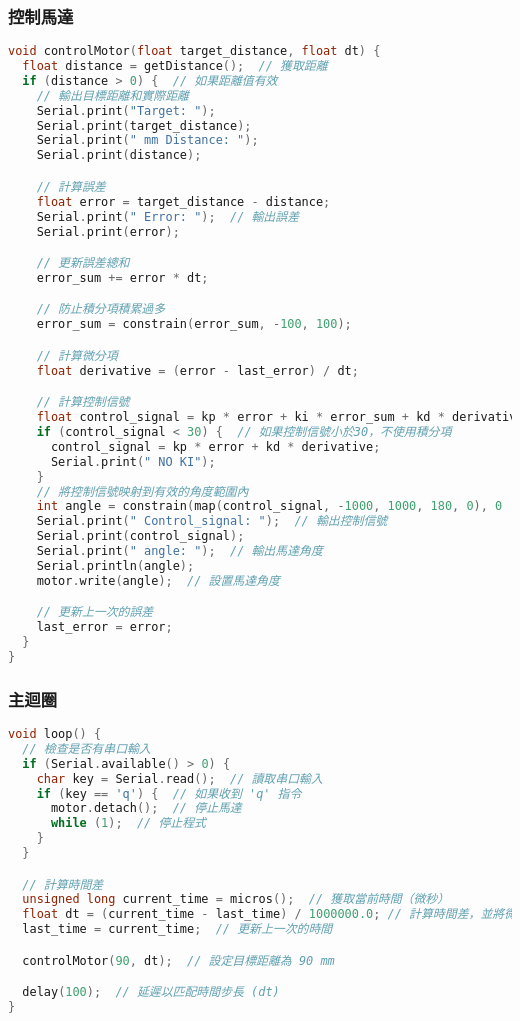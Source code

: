 \subsubsection{控制馬達}
\begin{lstlisting}[language=C]
void controlMotor(float target_distance, float dt) {
  float distance = getDistance();  // 獲取距離
  if (distance > 0) {  // 如果距離值有效
    // 輸出目標距離和實際距離
    Serial.print("Target: ");
    Serial.print(target_distance);
    Serial.print(" mm Distance: ");
    Serial.print(distance);

    // 計算誤差
    float error = target_distance - distance;
    Serial.print(" Error: ");  // 輸出誤差
    Serial.print(error);

    // 更新誤差總和
    error_sum += error * dt;

    // 防止積分項積累過多
    error_sum = constrain(error_sum, -100, 100);

    // 計算微分項
    float derivative = (error - last_error) / dt;

    // 計算控制信號
    float control_signal = kp * error + ki * error_sum + kd * derivative;
    if (control_signal < 30) {  // 如果控制信號小於30，不使用積分項
      control_signal = kp * error + kd * derivative;
      Serial.print(" NO KI");
    }
    // 將控制信號映射到有效的角度範圍內
    int angle = constrain(map(control_signal, -1000, 1000, 180, 0), 0 , 180);
    Serial.print(" Control_signal: ");  // 輸出控制信號
    Serial.print(control_signal);
    Serial.print(" angle: ");  // 輸出馬達角度
    Serial.println(angle);
    motor.write(angle);  // 設置馬達角度

    // 更新上一次的誤差
    last_error = error;
  }
}
\end{lstlisting}

\subsubsection{主迴圈}
\begin{lstlisting}[language=C]
void loop() {
  // 檢查是否有串口輸入
  if (Serial.available() > 0) {
    char key = Serial.read();  // 讀取串口輸入
    if (key == 'q') {  // 如果收到 'q' 指令
      motor.detach();  // 停止馬達
      while (1);  // 停止程式
    }
  }

  // 計算時間差
  unsigned long current_time = micros();  // 獲取當前時間（微秒）
  float dt = (current_time - last_time) / 1000000.0; // 計算時間差，並將微秒轉換為秒
  last_time = current_time;  // 更新上一次的時間

  controlMotor(90, dt);  // 設定目標距離為 90 mm

  delay(100);  // 延遲以匹配時間步長 (dt)
}
\end{lstlisting}


